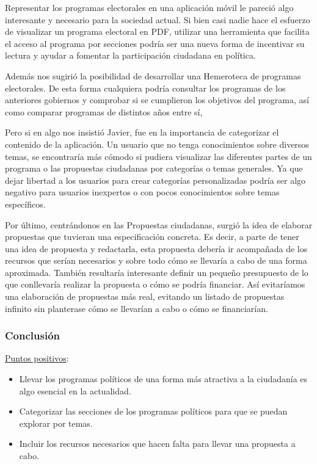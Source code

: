 Representar los programas electorales en una aplicación móvil le pareció algo interesante y necesario para la sociedad actual. Si bien casi nadie hace el esfuerzo de visualizar un programa electoral en PDF, utilizar una herramienta que facilita el acceso al programa por secciones podría ser una nueva forma de incentivar su lectura y ayudar a fomentar la participación ciudadana en política. 

Además nos sugirió la posibilidad de desarrollar una Hemeroteca de programas electorales. De esta forma cualquiera podría consultar los programas de los anteriores gobiernos y comprobar si se cumplieron los objetivos del programa, así como comparar programas de distintos años entre sí, 

Pero si en algo nos insistió Javier, fue en la importancia de categorizar el contenido de la aplicación. Un usuario que no tenga conocimientos sobre diversos temas, se encontraría más cómodo si pudiera visualizar las diferentes partes de un programa o las propuestas ciudadanas por categorías o temas generales. Ya que dejar libertad a los usuarios para crear categorías personalizadas podría ser algo negativo para usuarios inexpertos o con pocos conocimientos sobre temas específicos.

Por último, centrándonos en las Propuestas ciudadanas, surgió la idea de elaborar propuestas que tuvieran una especificación concreta. Es decir, a parte de tener una idea de propuesta y redactarla, esta propuesta debería ir acompañada de los recursos que serían necesarios y sobre todo cómo se llevaría a cabo de una forma aproximada. También resultaría interesante definir un pequeño presupuesto de lo que conllevaría realizar la propuesta o cómo se podría financiar. Así evitaríamos una elaboración de propuestas más real, evitando un listado de propuestas infinito sin planterase cómo se llevarían a cabo o cómo se financiarían.

\subsubsection{Conclusión}

\underline{Puntos positivos}:

\begin{itemize}
  \item Llevar los programas políticos de una forma más atractiva a la ciudadanía es algo esencial en la actualidad.
  \item Categorizar las secciones de los programas políticos para que se puedan explorar por temas.
  \item Incluir los recursos necesarios que hacen falta para llevar una propuesta a cabo.
\end{itemize}

